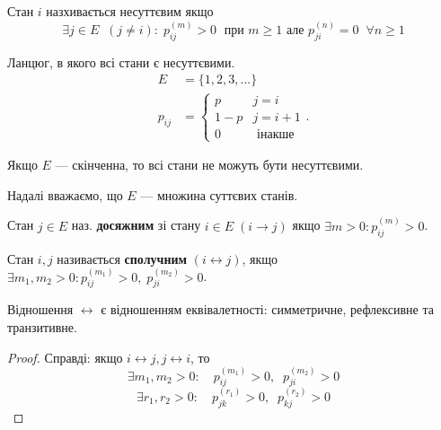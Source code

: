 \begin{definition}
  Стан $i$ назхивається несуттєвим якщо
  \[ \exists j \in  E \;\; (j \neq i) : \;
    p^{(m)}_{ij} > 0 \; \text{ при } m \geq 1 
  \text{ але } p^{(n)} _{ji} = 0 \;\; \forall n \geq 1\] 
\end{definition}

\begin{example}
  Ланцюг, в якого всі стани є несуттєвими.
  \begin{align*}
    E &= \{1, 2, 3, \ldots \} \\
    p_{ij} &= \begin{cases}
      p & j = i \\
      1 - p & j = i+1 \\
      0 & \text{ інакше }
    \end{cases}
  .\end{align*}
\end{example}

\begin{remark}
  Якщо $E$ --- скінченна, то всі стани не можуть бути несуттєвими.
\end{remark}

Надалі вважаємо, що $E$ --- множина суттєвих станів.

\begin{definition}
  Стан $j \in  E$ наз. \textbf{досяжним} зі стану $i \in  E \; \left( i \to  j \right) $
  якщо $\exists m > 0: p^{(m)}_{ij} > 0$.

  Стан $i, j$ називається \textbf{сполучним} $(i \leftrightarrow  j)$, якщо
  $\exists m_1,m_2 > 0: p^{(m_1)}_{ij} > 0, \; p^{(m_2)}_{ji} > 0$.
\end{definition}

\begin{remark}
  Відношення $\leftrightarrow$ є відношенням еквівалетності: симметричне, рефлексивне та транзитивне.
\end{remark}
\begin{proof}
  Справді: якщо $i \leftrightarrow j, j \leftrightarrow i $, то
   \[ \exists m_1, m_2 > 0 : \quad p^{(m_1)}_{ij} > 0, \;\; p^{(m_2)}_{ji} > 0 \] 
   \[ \exists r_1, r_2 > 0 : \quad p^{(r_1)}_{jk} > 0, \;\; p^{(r_2)}_{kj} > 0 \] 
\end{proof}

